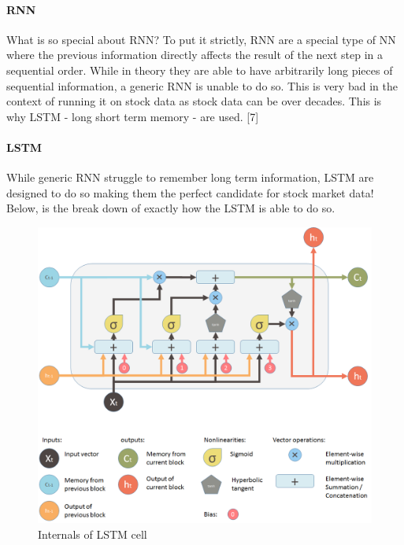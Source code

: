 \documentclass[12pt]{article}
\begin{document}
\paragraph{RNN}
What is so special about RNN? To put it strictly, RNN are a special type of NN where the previous information directly affects the result of the next step in a sequential order. While in theory they are able to have arbitrarily long pieces of sequential information, a generic RNN is unable to do so. This is very bad in the context of running it on stock data as stock data can be over decades. This is why LSTM - long short term memory - are used. [7] \nocite{britz_2016}

\paragraph{LSTM}
While generic RNN struggle to remember long term information, LSTM are designed to do so making them the perfect candidate for stock market data! Below, is the break down of exactly how the LSTM is able to do so.

\begin{figure}[H]
  \includegraphics[width=\linewidth]{images/LSTM.png}
  \caption{Internals of LSTM cell}
\end{figure}
\end{document}

